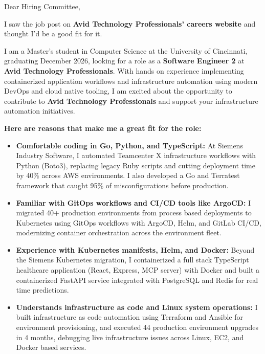 \documentclass[11pt]{letter}
\date{}
\begin{document}
\begin{letter}{}

\opening{Dear Hiring Committee,}

I saw the job post on \textbf{Avid Technology Professionals' careers website} and thought I'd be a good fit for it.

I am a Master's student in Computer Science at the University of Cincinnati, graduating December 2026, looking for a role as a \textbf{Software Engineer 2} at \textbf{Avid Technology Professionals}. With hands on experience implementing containerized application workflows and infrastructure automation using modern DevOps and cloud native tooling, I am excited about the opportunity to contribute to \textbf{Avid Technology Professionals} and support your infrastructure automation initiatives.

\textbf{Here are reasons that make me a great fit for the role:}

\begin{itemize}[leftmargin=*, itemsep=0.45em]
    \item \textbf{Comfortable coding in Go, Python, and TypeScript:} At Siemens Industry Software, I automated Teamcenter X infrastructure workflows with Python (Boto3), replacing legacy Ruby scripts and cutting deployment time by 40\% across AWS environments. I also developed a Go and Terratest framework that caught 95\% of misconfigurations before production.

    \item \textbf{Familiar with GitOps workflows and CI/CD tools like ArgoCD:} I migrated 40+ production environments from process based deployments to Kubernetes using GitOps workflows with ArgoCD, Helm, and GitLab CI/CD, modernizing container orchestration across the environment fleet.

    \item \textbf{Experience with Kubernetes manifests, Helm, and Docker:} Beyond the Siemens Kubernetes migration, I containerized a full stack TypeScript healthcare application (React, Express, MCP server) with Docker and built a containerized FastAPI service integrated with PostgreSQL and Redis for real time predictions.

    \item \textbf{Understands infrastructure as code and Linux system operations:} I built infrastructure as code automation using Terraform and Ansible for environment provisioning, and executed 44 production environment upgrades in 4 months, debugging live infrastructure issues across Linux, EC2, and Docker based services.


\end{itemize}
\end{letter}
\end{document}
